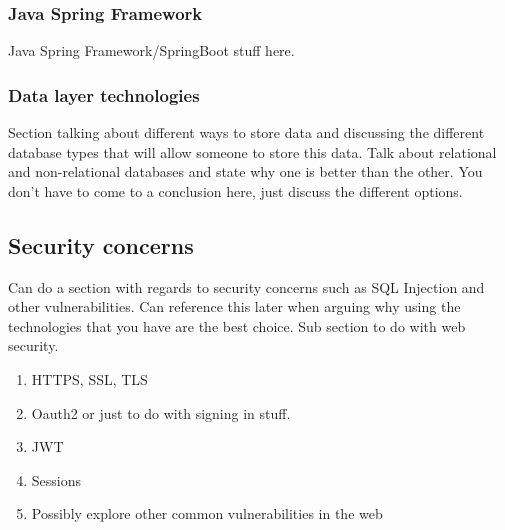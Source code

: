 \subsubsection*{Java Spring Framework}
Java Spring Framework/SpringBoot stuff here.

\subsubsection{Data layer technologies}
Section talking about different ways to store data and discussing the different database types
that will allow someone to store this data. Talk about relational and non-relational databases and
state why one is better than the other. You don't have to come to a conclusion here, just discuss
the different options.


\subsection{Security concerns}

Can do a section with regards to security concerns such as SQL Injection and other vulnerabilities.
Can reference this later when arguing why using the technologies that you have are the best choice.
Sub section to do with web security.
\begin{enumerate}
    \item HTTPS, SSL, TLS
    \item Oauth2 or just to do with signing in stuff.
    \item JWT
    \item Sessions
    \item Possibly explore other common vulnerabilities in the web
\end{enumerate}